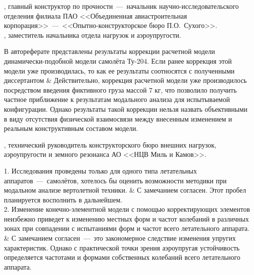 \begin{frame}
	\beginSkip
	, главный конструктор по прочности~---~начальник научно-исследовательского отделения филиала ПАО <<Объединенная авиастроительная корпорация>>~---~<<Опытно-конструкторское бюро П.О.~Сухого>>. \\
	, заместитель начальника отдела нагрузок и аэроупругости. \\
	\begin{comtblr}{15em}
		В автореферате представлены результаты коррекции расчетной модели динамически-подобной модели самолёта Ту-204. Если ранее коррекция этой модели уже производилась, то как ее результаты соотносятся с полученными диссертантом
		&
		Действительно, коррекция расчетной модели уже производилось посредством введения фиктивного груза массой $ 7 $ кг, что позволило получить частное приближение к результатам модального анализа для испытываемой конфигурации. Однако результаты такой коррекции нельзя назвать объективными в виду отсутствия физической взаимосвязи между внесенным изменением и реальным конструктивным составом модели. 
	\end{comtblr}
\end{frame}

\begin{frame}
	\beginSkip
	, технический руководитель конструкторского бюро внешних нагрузок, аэроупругости и земного резонанса АО <<НЦВ Миль и Камов>>. \\
	\begin{comtblr}{15em}
		1. Исследования проведены только для одного типа летательных аппаратов~---~самолётов, хотелось бы оценить возможности методики при модальном анализе вертолетной техники.
		&
		С замечанием согласен. Этот пробел планируется восполнить в дальнейшем. \\
		2. Изменение конечно-элементной модели с помощью корректирующих элементов неизбежно приведет к изменению местных форм и частот колебаний в различных зонах при совпадении с испытаниями форм и частот всего летательного аппарата.
		&
		С замечанием согласен~---~это закономерное следствие изменения упругих характеристик. Однако с практической точки зрения аэроупругая устойчивость определяется частотами и формами собственных колебаний всего летательного аппарата.
	\end{comtblr}
\end{frame}

